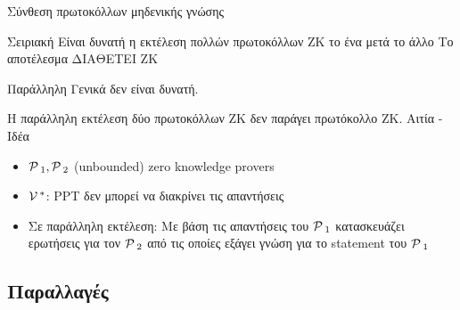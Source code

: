 \documentclass[10pt,handout]{beamer}
\begin{document}
\begin{frame}{Σύνθεση πρωτοκόλλων μηδενικής γνώσης}

	\begin{block}{Σειριακή}
		Είναι δυνατή η εκτέλεση πολλών πρωτοκόλλων ΖΚ το ένα  μετά το άλλο
		Το αποτέλεσμα ΔΙΑΘΕΤΕΙ ZK
	\end{block}
	\pause
	\begin{block}{Παράλληλη}
	Γενικά \alert{δεν} είναι δυνατή. 

	Η παράλληλη εκτέλεση δύο πρωτοκόλλων ΖΚ δεν παράγει πρωτόκολλο ΖΚ.
	\pause
	{Αιτία - Ιδέα}
	\begin{itemize}
		\item $\mathcal{P}\,_1, \mathcal{P}\,_2$ (unbounded) zero knowledge provers
		\item $\mathcal{V}\,^*$: PPT δεν μπορεί να διακρίνει τις απαντήσεις 
		\item Σε παράλληλη εκτέλεση: Με βάση τις απαντήσεις του $\mathcal{P}\,_1$ κατασκευάζει ερωτήσεις για τον $\mathcal{P}\,_2$ από τις οποίες εξάγει γνώση για το statement του $\mathcal{P}\,_1$		
	\end{itemize}
		
	\end{block}
\end{frame}

\subsection{Παραλλαγές}
\end{document}
